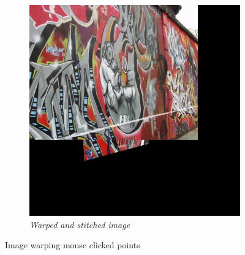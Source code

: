 \documentclass[11pt, a4paper]{article}
\begin{document}
\begin{figure}[H]
\begin{subfigure}[b]{0.32\textwidth}
		\centering
		\includegraphics[width=\textwidth]{./images/Q3im1Warp.jpg}
		\caption{{\small \textit{Warped and stitched image}}}
		\label{fig:3imw}
	\end{subfigure}
	\caption{Image warping mouse clicked points}
\end{figure}
\end{document}
